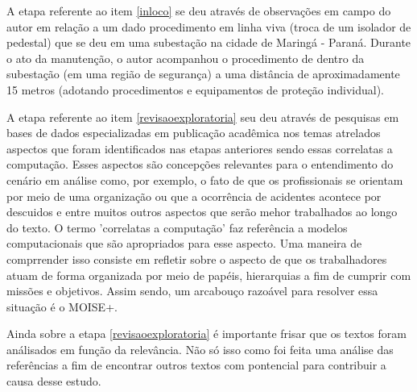 A etapa referente ao item \ref{inloco} se deu através de observações em campo do autor em relação a um dado procedimento em linha viva (troca de um isolador de pedestal) que se deu em uma subestação na cidade de Maringá - Paraná. Durante o ato da manutenção, o autor acompanhou o procedimento de dentro da subestação (em uma região de segurança) a uma distância de aproximadamente 15 metros (adotando procedimentos e equipamentos de proteção individual).

A etapa referente ao item \ref{revisaoexploratoria} seu deu através de pesquisas em bases de dados especializadas em publicação acadêmica nos temas atrelados aspectos que foram identificados nas etapas anteriores sendo essas correlatas a computação. Esses aspectos são concepções relevantes para o entendimento do cenário em análise como, por exemplo,  o fato de que os profissionais se orientam por meio de uma organização ou que a ocorrência de acidentes acontece por descuidos e entre muitos outros aspectos que serão mehor trabalhados ao longo do texto. O termo 'correlatas a computação' faz referência a modelos computacionais que são apropriados para esse aspecto. Uma maneira de comprrender isso consiste em refletir sobre o aspecto de que os trabalhadores atuam de forma organizada por meio de papéis, hierarquias a fim de cumprir com missões e objetivos. Assim sendo, um arcabouço razoável para resolver essa situação é o MOISE+. 

Ainda sobre a etapa \ref{revisaoexploratoria} é importante frisar que os textos foram análisados em função da relevância. Não só isso como foi feita uma análise das referências a fim de encontrar outros textos com pontencial para contribuir a causa desse estudo.